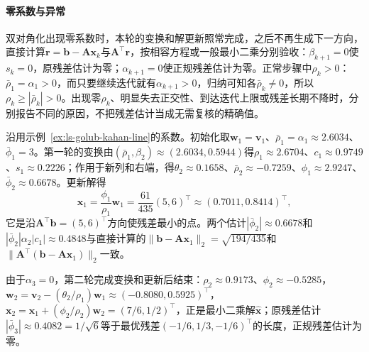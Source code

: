 \paragraph{零系数与异常}
双对角化出现零系数时，本轮的变换和解更新照常完成，之后不再生成下一方向，直接计算$\bm r=\bm b-\bm A\bm x_k$与$\bm A^\top\bm r$，按相容方程或一般最小二乘分别验收：$\beta_{k+1}=0$使$s_k=0$，原残差估计为零；$\alpha_{k+1}=0$使正规残差估计为零。正常步骤中$\rho_k>0$：$\bar\rho_1=\alpha_1>0$，而只要继续迭代就有$\alpha_{k+1}>0$，归纳可知各$\bar\rho_k\ne0$，所以$\rho_k\ge|\bar\rho_k|>0$。出现零$\rho_k$、明显失去正交性、到达迭代上限或残差长期不降时，分别报告不同的原因，不把残差估计当成无需复核的精确值。

\begin{example}[直线拟合上的LSQR]
\label{ex:ls-lsqr-line}
沿用示例~\ref{ex:ls-golub-kahan-line}的系数。初始化取$\bm w_1=\bm v_1$、$\bar\rho_1=\alpha_1\approx2.6034$、$\bar\phi_1=3$。第一轮的变换由$(\bar\rho_1,\beta_2)\approx(2.6034,0.5944)$得$\rho_1\approx2.6704$、$c_1\approx0.9749$、$s_1\approx0.2226$；作用于新列和右端，得$\theta_2\approx0.1658$、$\bar\rho_2\approx-0.7259$、$\phi_1\approx2.9247$、$\bar\phi_2\approx0.6678$。更新解得
\[
 \bm x_1=\frac{\phi_1}{\rho_1}\bm w_1=\frac{61}{435}(5,6)^\top\approx(0.7011,0.8414)^\top ,
\]
它是沿$\bm A^\top\bm b=(5,6)^\top$方向使残差最小的点。两个估计$|\bar\phi_2|\approx0.6678$和$|\bar\phi_2|\alpha_2|c_1|\approx0.4848$与直接计算的$\lVert\bm b-\bm A\bm x_1\rVert_2=\sqrt{194/435}$和$\lVert\bm A^\top(\bm b-\bm A\bm x_1)\rVert_2$一致。

由于$\alpha_3=0$，第二轮完成变换和更新后结束：$\rho_2\approx0.9173$、$\phi_2\approx-0.5285$，$\bm w_2=\bm v_2-(\theta_2/\rho_1)\bm w_1\approx(-0.8080,0.5925)^\top$，$\bm x_2=\bm x_1+(\phi_2/\rho_2)\bm w_2=(7/6,1/2)^\top$，正是最小二乘解$\hat{\bm x}$；原残差估计$|\bar\phi_3|\approx0.4082=1/\sqrt6$等于最优残差$(-1/6,1/3,-1/6)^\top$的长度，正规残差估计为零。
\end{example}

